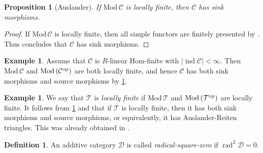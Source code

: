 \documentclass[12pt]{amsart}
\numberwithin{equation}{subsection}
\theoremstyle{plain}
\newtheorem{proposition}[theorem]{Proposition}
\theoremstyle{definition}
\newtheorem{definition}[theorem]{Definition}
\newtheorem{example}[theorem]{Example}
\newcommand{\rad}{\operatorname{rad}}
\newcommand{\Mod}{\mathrm{Mod}\,}
\newcommand{\ind}{\operatorname{ind}}
\newcommand{\T}{\mathcal{T}}
\newcommand{\D}{\mathcal{D}}
\newcommand{\C}{\mathcal{C}}
\newcommand{\op}{{\rm op}}
\begin{document}
\begin{proposition}[Auslander] \label{claim_16}
If $\Mod\C$ is locally finite, then  $\C$ has sink morphisms. 
\end{proposition}
\begin{proof}
If $\Mod\C$ is locally finite, then all simple functors are finitely presented by \cite[Proposition 1.11 and Theorem 2.12]{Auslander_1974_II}.
Thus \cite[Proposition 2.7]{Auslander_1974_II} concludes that $\C$ has sink morphisms.
\end{proof}



\begin{example}\label{example_1}
Assume that $\C$ is $R$-linear Hom-finite with $|\ind\C|<\infty$.
Then $\Mod\C$ and $\Mod(\C^\op)$ are both locally finite, and hence  $\C$ has both sink morphisms and source morphisms by \cref{claim_16}.
\end{example}




\begin{example}\label{example_2}
We say that $\T$ is {\it locally finite} if $\Mod\T$ and $\Mod(\T^\op)$ are locally finite.
It follows from \cref{claim_16} and  that if $\T$ is locally finite, then it has both sink morphisms and source morphisms, or equivalently, it has Auslander-Reiten triangles.
This was already obtained in \cite[Corollary 3.2]{Krause_2012}.
\end{example}





\begin{definition}
An additive category $\D$ is called {\it radical-square-zero} if $\rad^2\D=0$.  
\end{definition}
\end{document}
